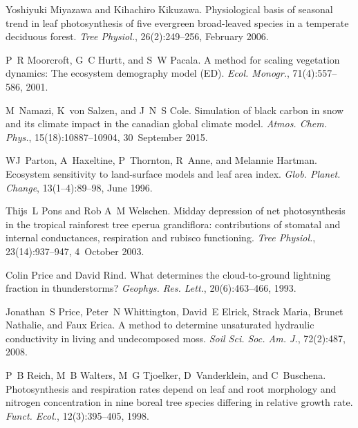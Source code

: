 \begin{DoxyDescription}
\item[\label{_CITEREF_Miyazawa2006-so}%
\mbox{[}57\mbox{]}]Yoshiyuki Miyazawa and Kihachiro Kikuzawa. Physiological basis of seasonal trend in leaf photosynthesis of five evergreen broad-\/leaved species in a temperate deciduous forest. {\itshape Tree Physiol.}, 26(2)\+:249--256, February 2006.


\item[\label{_CITEREF_Moorcroft2001-co}%
\mbox{[}58\mbox{]}]P~R Moorcroft, G~C Hurtt, and S~W Pacala. A method for scaling vegetation dynamics\+: The ecosystem demography model (E\+D). {\itshape Ecol. Monogr.}, 71(4)\+:557--586, 2001. 


\item[\label{_CITEREF_Namazi2015-wz}%
\mbox{[}59\mbox{]}]M~Namazi, K~von Salzen, and J~N~S Cole. Simulation of black carbon in snow and its climate impact in the canadian global climate model. {\itshape Atmos. Chem. Phys.}, 15(18)\+:10887--10904, 30~September 2015. 


\item[\label{_CITEREF_Parton1996-zv}%
\mbox{[}60\mbox{]}]W\+J~Parton, A~Haxeltine, P~Thornton, R~Anne, and Melannie Hartman. Ecosystem sensitivity to land-\/surface models and leaf area index. {\itshape Glob. Planet. Change}, 13(1–4)\+:89--98, June 1996. 


\item[\label{_CITEREF_Pons2003-f26}%
\mbox{[}61\mbox{]}]Thijs~L Pons and Rob A~M Welschen. Midday depression of net photosynthesis in the tropical rainforest tree eperua grandiflora\+: contributions of stomatal and internal conductances, respiration and rubisco functioning. {\itshape Tree Physiol.}, 23(14)\+:937--947, 4~October 2003.


\item[\label{_CITEREF_Price1993-fm}%
\mbox{[}62\mbox{]}]Colin Price and David Rind. What determines the cloud-\/to-\/ground lightning fraction in thunderstorms? {\itshape Geophys. Res. Lett.}, 20(6)\+:463--466, 1993. 


\item[\label{_CITEREF_Price2008-fr}%
\mbox{[}63\mbox{]}]Jonathan~S Price, Peter~N Whittington, David~E Elrick, Strack Maria, Brunet Nathalie, and Faux Erica. A method to determine unsaturated hydraulic conductivity in living and undecomposed moss. {\itshape Soil Sci. Soc. Am. J.}, 72(2)\+:487, 2008. 


\item[\label{_CITEREF_Reich1998-zr}%
\mbox{[}64\mbox{]}]P~B Reich, M~B Walters, M~G Tjoelker, D~Vanderklein, and C~Buschena. Photosynthesis and respiration rates depend on leaf and root morphology and nitrogen concentration in nine boreal tree species differing in relative growth rate. {\itshape Funct. Ecol.}, 12(3)\+:395--405, 1998. 



\end{DoxyDescription}
